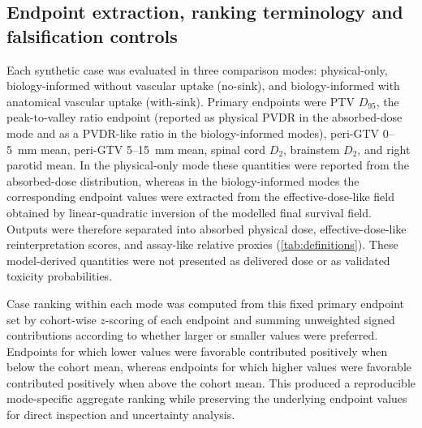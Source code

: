 \documentclass[10pt,a4paper]{article}
\begin{document}
\subsection{Endpoint extraction, ranking terminology and falsification controls}

Each synthetic case was evaluated in three comparison modes: physical-only, biology-informed without vascular uptake (no-sink), and biology-informed with anatomical vascular uptake (with-sink). Primary endpoints were PTV $D_{95}$, the peak-to-valley ratio endpoint (reported as physical PVDR in the absorbed-dose mode and as a PVDR-like ratio in the biology-informed modes), peri-GTV 0--5~mm mean, peri-GTV 5--15~mm mean, spinal cord $D_2$, brainstem $D_2$, and right parotid mean. In the physical-only mode these quantities were reported from the absorbed-dose distribution, whereas in the biology-informed modes the corresponding endpoint values were extracted from the effective-dose-like field obtained by linear-quadratic inversion of the modelled final survival field. Outputs were therefore separated into absorbed physical dose, effective-dose-like reinterpretation scores, and assay-like relative proxies (\cref{tab:definitions}). These model-derived quantities were not presented as delivered dose or as validated toxicity probabilities.

Case ranking within each mode was computed from this fixed primary endpoint set by cohort-wise $z$-scoring of each endpoint and summing unweighted signed contributions according to whether larger or smaller values were preferred. Endpoints for which lower values were favorable contributed positively when below the cohort mean, whereas endpoints for which higher values were favorable contributed positively when above the cohort mean. This produced a reproducible mode-specific aggregate ranking while preserving the underlying endpoint values for direct inspection and uncertainty analysis.
\end{document}
